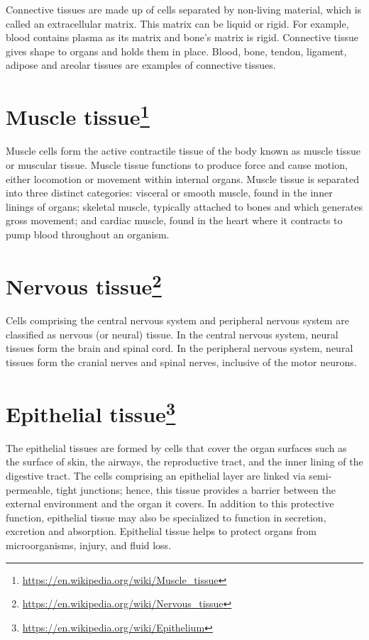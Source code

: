 \documentclass[]{book}
\let\rmarkdownfootnote\footnote%
\def\footnote{\protect\rmarkdownfootnote}
\renewcommand{\href}[2]{#2\footnote{\url{#1}}}
\theoremstyle{definition}
\theoremstyle{definition}
\theoremstyle{definition}
\theoremstyle{remark}
\begin{document}
Connective tissues are made up of cells separated by non-living
material, which is called an extracellular matrix. This matrix can be
liquid or rigid. For example, blood contains plasma as its matrix and
bone's matrix is rigid. Connective tissue gives shape to organs and
holds them in place. Blood, bone, tendon, ligament, adipose and areolar
tissues are examples of connective tissues.

\section{\texorpdfstring{\href{https://en.wikipedia.org/wiki/Muscle_tissue}{Muscle
tissue}}{Muscle tissue}}\label{muscle-tissue}

Muscle cells form the active contractile tissue of the body known as
muscle tissue or muscular tissue. Muscle tissue functions to produce
force and cause motion, either locomotion or movement within internal
organs. Muscle tissue is separated into three distinct categories:
visceral or smooth muscle, found in the inner linings of organs;
skeletal muscle, typically attached to bones and which generates gross
movement; and cardiac muscle, found in the heart where it contracts to
pump blood throughout an organism.

\section{\texorpdfstring{\href{https://en.wikipedia.org/wiki/Nervous_tissue}{Nervous
tissue}}{Nervous tissue}}\label{nervous-tissue}

Cells comprising the central nervous system and peripheral nervous
system are classified as nervous (or neural) tissue. In the central
nervous system, neural tissues form the brain and spinal cord. In the
peripheral nervous system, neural tissues form the cranial nerves and
spinal nerves, inclusive of the motor neurons.

\section{\texorpdfstring{\href{https://en.wikipedia.org/wiki/Epithelium}{Epithelial
tissue}}{Epithelial tissue}}\label{epithelial-tissue}

The epithelial tissues are formed by cells that cover the organ surfaces
such as the surface of skin, the airways, the reproductive tract, and
the inner lining of the digestive tract. The cells comprising an
epithelial layer are linked via semi-permeable, tight junctions; hence,
this tissue provides a barrier between the external environment and the
organ it covers. In addition to this protective function, epithelial
tissue may also be specialized to function in secretion, excretion and
absorption. Epithelial tissue helps to protect organs from
microorganisms, injury, and fluid loss.
\end{document}
